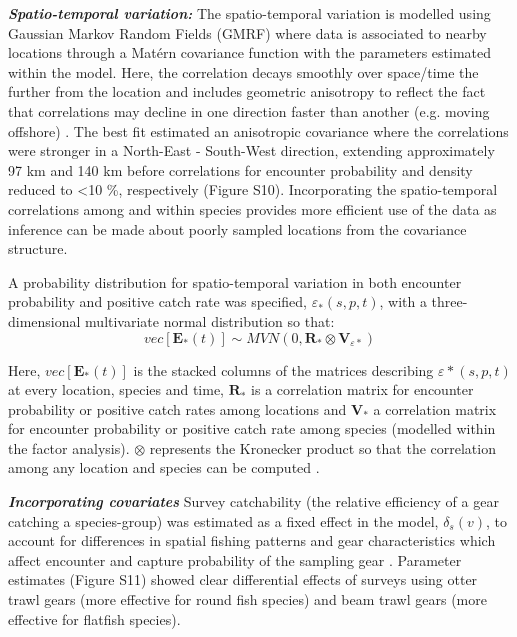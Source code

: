 \documentclass{nature}
\begin{document}
\begin{linenumbers}
\textbf{\textit{Spatio-temporal variation:}} The spatio-temporal variation is
modelled using Gaussian Markov Random Fields (GMRF) where data is associated to
nearby locations through a Matérn covariance function with the parameters
estimated within the model. Here, the correlation decays smoothly over
space/time the further from the location and includes geometric anisotropy to
reflect the fact that correlations may decline in one direction faster than
another (e.g. moving offshore) \cite{Thorson2013}.  The best fit estimated an
anisotropic covariance where the correlations were stronger in a North-East -
South-West direction, extending approximately 97 km and 140 km before
correlations for encounter probability and density reduced to \textless 10 \%,
respectively (Figure S10).  Incorporating the spatio-temporal correlations
among and within species provides more efficient use of the data as inference
can be made about poorly sampled locations from the covariance structure.

A probability distribution for spatio-temporal variation in both encounter
probability and positive catch rate was specified, $\varepsilon_{*}(s,p,t)$,
with a three-dimensional multivariate normal distribution so that:
	\begin{equation}
		vec[\mathbf{E}_{*}(t)] \sim MVN(0,\mathbf{R}_{*} \otimes
		\mathbf{V}_{{\varepsilon}{*}})
	\end{equation}

Here, $vec[\mathbf{E}_{*}(t)]$ is the stacked columns of the matrices
describing $\varepsilon{*}(s,p,t)$ at every location, species and time,
$\mathbf{R}_{*}$ is a correlation matrix for encounter probability or positive
catch rates among locations and $\mathbf{V}_{*}$ a correlation matrix for
encounter probability or positive catch rate among species (modelled within the
factor analysis). $\otimes$ represents the Kronecker product so that the
correlation among any location and species can be computed \cite{Thorson2017}.
		
\textbf{\textit{Incorporating covariates}} Survey catchability (the relative
efficiency of a gear catching a species-group) was estimated as a fixed effect
in the model, $\delta_{s}(v)$, to account for differences in spatial fishing
patterns and gear characteristics which affect encounter and capture
probability of the sampling gear \cite{Thorson2014}. Parameter estimates
(Figure S11) showed clear differential effects of surveys using otter trawl
gears (more effective for round fish species) and beam trawl gears (more
effective for flatfish species).


\end{linenumbers}
\end{document}
